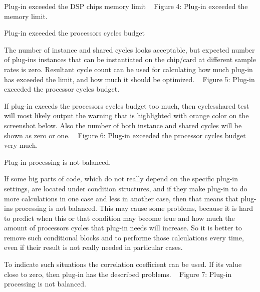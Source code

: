 \begin{DoxyEnumerate}
\item Plug-\/in exceeded the D\+SP chip\textquotesingle{}s memory limit ~\newline
  Figure 4\+: Plug-\/in exceeded the memory limit.  
\item Plug-\/in exceeded the processors cycles budget 
\begin{DoxyItemize}
\item The number of instance and shared cycles looks acceptable, but expected number of plug-\/in\textquotesingle{}s instances that can be instantiated on the chip/card at different sample rates is zero. Resultant cycle count can be used for calculating how much plug-\/in has exceeded the limit, and how much it should be optimized. ~\newline
  Figure 5\+: Plug-\/in exceeded the processor cycles budget.  
\item If plug-\/in exceeds the processor\textquotesingle{}s cycles budget too much, then cyclesshared test will most likely output the warning that is highlighted with orange color on the screenshot below. Also the number of both instance and shared cycles will be shown as zero or one. ~\newline
  Figure 6\+: Plug-\/in exceeded the processor cycles budget very much.  
\end{DoxyItemize}
\item Plug-\/in processing is not balanced.

 If some big parts of code, which do not really depend on the specific plug-\/in settings, are located under condition structures, and if they make plug-\/in to do more calculations in one case and less in another case, then that means that plug-\/in\textquotesingle{}s processing is not balanced. This may cause some problems, because it is hard to predict when this or that condition may become true and how much the amount of processor\textquotesingle{}s cycles that plug-\/in needs will increase. So it is better to remove such conditional blocks and to performe those calculations every time, even if their result is not really needed in particular cases.

 To indicate such situations the correlation coefficient can be used. If its value close to zero, then plug-\/in has the described problems. ~\newline
  Figure 7\+: Plug-\/in processing is not balanced.  
\end{DoxyEnumerate}

